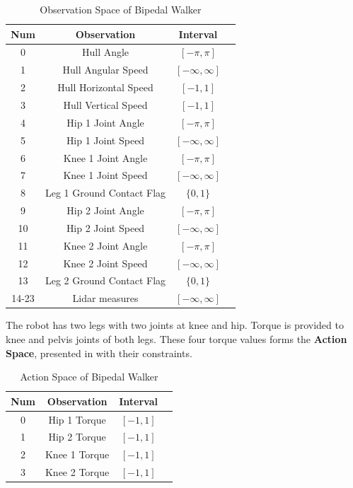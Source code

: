 \begin{table}%
	\begin{center}
	\begin{tabular}{cccc}
		\textbf{Num} & \textbf{Observation} & \textbf{Interval} \\
		\hline 
		0  & Hull Angle & $[-\pi,\pi]$ \\
		1  & Hull Angular Speed & $[-\infty,\infty]$ \\
		2  & Hull Horizontal Speed & $[-1,1]$ \\
		3  & Hull Vertical Speed &$[-1,1]$ \\
		4  & Hip 1 Joint Angle & $[-\pi,\pi]$ \\
		5  & Hip 1 Joint Speed & $[-\infty,\infty]$ \\
		6  & Knee 1 Joint Angle & $[-\pi,\pi]$ \\
		7  & Knee 1 Joint Speed & $[-\infty,\infty]$ \\
		8  & Leg 1 Ground Contact Flag & $\{0,1\}$ \\
		9  & Hip 2 Joint Angle & $[-\pi,\pi]$ \\
		10  & Hip 2 Joint Speed & $[-\infty,\infty]$ \\
		11  & Knee 2 Joint Angle & $[-\pi,\pi]$ \\
		12  & Knee 2 Joint Speed & $[-\infty,\infty]$ \\
		13  & Leg 2 Ground Contact Flag & $\{0,1\}$ \\
		14-23  & Lidar measures  & $[-\infty,\infty]$
	\end{tabular}
	\end{center}
	\caption{Observation Space of Bipedal Walker}
	\label{table:bpw_obs_space}
\end{table}

The robot has two legs with two joints at knee and hip. Torque is provided to knee and pelvis joints of both legs. These four torque values forms the \textbf{Action Space}, presented in  with their constraints. 

\begin{table}%
	\begin{center}
		\begin{tabular}{cccc}
			\textbf{Num} & \textbf{Observation} & \textbf{Interval} \\
			\hline
			0  & Hip 1 Torque & $[-1,1]$ \\
			1  & Hip 2 Torque & $[-1,1]$ \\
			2  & Knee 1 Torque & $[-1,1]$ \\
			3  & Knee 2 Torque & $[-1,1]$ \\
		\end{tabular}
	\end{center}
	\caption{Action Space of Bipedal Walker}
	\label{table:bpw_act_space}
\end{table}


